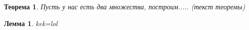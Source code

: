
\usepackage{setspace}
\usepackage{amsmath}

\DeclareMathOperator{\sinc}{sinc}
\newcommand{\dif}[3]{


\pgfplotstablegetelem{0}{#2}\of#1

\pgfplotstablecreatecol
    [expr={\thisrow{#2} - \pgfplotsretval}]
    {LocalDistance#3}{#1}

\pgfplotstablecreatecol
    [expr={-\thisrow{LocalDistance#3} + \prevrow{LocalDistance#3}}]
    {#3}{#1}

}
\newcommand{\Exp}[1]{
	\exp\left(#1\right)
}
\newcommand{\Sinc}[1]{
	\sinc\left(#1\right)
}
\newcommand{\Sin}[1]{
	\sin\left(#1\right)
}


\newtheorem{theorem}{Теорема}[section]
\newtheorem{lemma}{Лемма}[section]

\def\labauthors{Понур К.А., Сарафанов Ф.Г., Сидоров Д.А.}
\def\labgroup{420}
\def\labnumber{320}
\def\labtheme{Дифракций Фраунгофера}
\renewcommand{\vec}{\mathbf}
\renewcommand{\Re}{\operatorname{Re}}
\renewcommand{\Im}{\operatorname{Im}}
\renewcommand{\phi}{\varphi}
\renewcommand{\kappa}{\varkappa}
\renewcommand{\hat}{\widehat}

\begin{spacing}{1}
\tableofcontents
\end{spacing}
\newpage
\begin{theorem} \label{t1} %
Пусть у нас есть два множества, построим..... (текст теоремы)
\end{theorem}

\begin{lemma}
kek=lol
\end{lemma}
